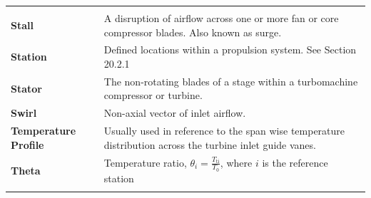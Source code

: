 \documentclass[
]{book}
\begin{document}
\begin{longtable}[]{@{}ll@{}}
\begin{minipage}[t]{0.71\columnwidth}
\end{minipage}\tabularnewline
\begin{minipage}[t]{0.24\columnwidth}\raggedright
\textbf{Stall}\strut
\end{minipage} & \begin{minipage}[t]{0.71\columnwidth}\raggedright
A disruption of airflow across one or more fan or core compressor blades. Also known as surge.\strut
\end{minipage}\tabularnewline
\begin{minipage}[t]{0.24\columnwidth}\raggedright
\textbf{Station}\strut
\end{minipage} & \begin{minipage}[t]{0.71\columnwidth}\raggedright
Defined locations within a propulsion system. See Section 20.2.1\strut
\end{minipage}\tabularnewline
\begin{minipage}[t]{0.24\columnwidth}\raggedright
\textbf{Stator}\strut
\end{minipage} & \begin{minipage}[t]{0.71\columnwidth}\raggedright
The non-rotating blades of a stage within a turbomachine compressor or turbine.\strut
\end{minipage}\tabularnewline
\begin{minipage}[t]{0.24\columnwidth}\raggedright
\textbf{Swirl}\strut
\end{minipage} & \begin{minipage}[t]{0.71\columnwidth}\raggedright
Non-axial vector of inlet airflow.\strut
\end{minipage}\tabularnewline
\begin{minipage}[t]{0.24\columnwidth}\raggedright
\textbf{Temperature Profile}\strut
\end{minipage} & \begin{minipage}[t]{0.71\columnwidth}\raggedright
Usually used in reference to the span wise temperature distribution across the turbine inlet guide vanes.\strut
\end{minipage}\tabularnewline
\begin{minipage}[t]{0.24\columnwidth}\raggedright
\textbf{Theta}\strut
\end{minipage} & \begin{minipage}[t]{0.71\columnwidth}\raggedright
Temperature ratio, \(\theta_{i} = \frac{T_{\mathrm{ti}}}{T_{0}}\), where \(i\) is the reference station\strut
\end{minipage}\tabularnewline
\begin{minipage}[t]{0.24\columnwidth}\raggedright

\end{minipage}
\end{longtable}
\end{document}
